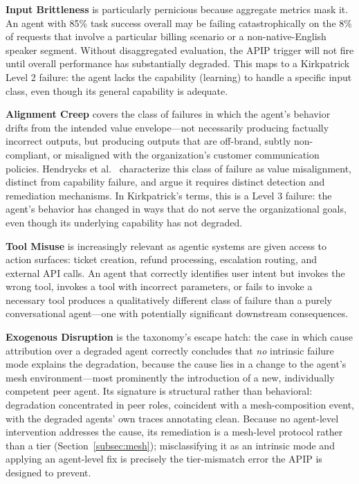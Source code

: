 \documentclass[conference]{IEEEtran}
\begin{document}
\textbf{Input Brittleness} is particularly pernicious because aggregate metrics
mask it. An agent with 85\% task success overall may be failing catastrophically
on the 8\% of requests that involve a particular billing scenario or a
non-native-English speaker segment. Without disaggregated evaluation, the APIP
trigger will not fire until overall performance has substantially degraded.
This maps to a Kirkpatrick Level 2 failure: the agent lacks the capability
(learning) to handle a specific input class, even though its general capability
is adequate.

\textbf{Alignment Creep} covers the class of failures in which the agent's
behavior drifts from the intended value envelope---not necessarily producing
factually incorrect outputs, but producing outputs that are off-brand, subtly
non-compliant, or misaligned with the organization's customer communication
policies. Hendrycks et al.~\cite{hendrycks2021values} characterize this class
of failure as value misalignment, distinct from capability failure, and argue
it requires distinct detection and remediation mechanisms. In Kirkpatrick's
terms, this is a Level 3 failure: the agent's behavior has changed in ways that
do not serve the organizational goals, even though its underlying capability
has not degraded.

\textbf{Tool Misuse} is increasingly relevant as agentic systems are given
access to action surfaces: ticket creation, refund processing, escalation
routing, and external API calls. An agent that correctly identifies user intent
but invokes the wrong tool, invokes a tool with incorrect parameters, or fails
to invoke a necessary tool produces a qualitatively different class of failure
than a purely conversational agent---one with potentially significant downstream
consequences.

\textbf{Exogenous Disruption} is the taxonomy's escape hatch: the case in which
cause attribution over a degraded agent correctly concludes that \emph{no}
intrinsic failure mode explains the degradation, because the cause lies in a
change to the agent's mesh environment---most prominently the introduction of a
new, individually competent peer agent. Its signature is structural rather than
behavioral: degradation concentrated in peer roles, coincident with a
mesh-composition event, with the degraded agents' own traces annotating clean.
Because no agent-level intervention addresses the cause, its remediation is a
mesh-level protocol rather than a tier
(Section~\ref{subsec:mesh}); misclassifying it as an intrinsic mode and
applying an agent-level fix is precisely the tier-mismatch error the APIP is
designed to prevent.
\end{document}
